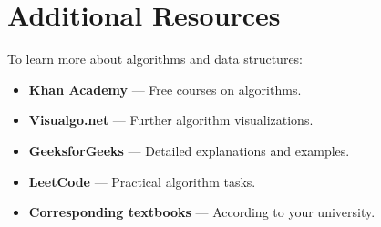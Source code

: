 \section{Additional Resources}

To learn more about algorithms and data structures:
\begin{itemize}
  \item \textbf{Khan Academy} — Free courses on algorithms.
  \item \textbf{Visualgo.net} — Further algorithm visualizations.
  \item \textbf{GeeksforGeeks} — Detailed explanations and examples.
  \item \textbf{LeetCode} — Practical algorithm tasks.
  \item \textbf{Corresponding textbooks} — According to your university.
\end{itemize}


